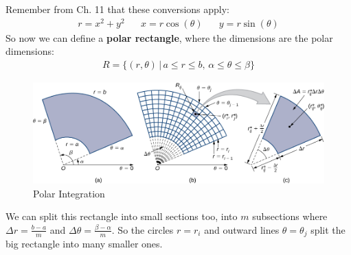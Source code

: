 \documentclass{article}
\begin{document}
Remember from Ch. 11 that these conversions apply:
\begin{gather*}
    r = x^2 + y^2 \hspace{20pt} x = r\cos(\theta) \hspace{20pt} y = r\sin(\theta)
\end{gather*}
So now we can define a \textbf{polar rectangle}, where the dimensions are the polar dimensions:
\begin{gather*}
    R =\{(r,\theta)\,|\, a \leqslant r \leqslant b,\, \alpha \leqslant \theta \leqslant \beta\}
\end{gather*}
\begin{figure}[H]
\begin{center}
\includegraphics[scale=0.5]{PolarRect.png}
\caption{Polar Integration}
\label{polrect}
\end{center}
\end{figure}
We can split this rectangle into small sections too, into $m$ subsections where $\Delta r = \frac{b-a}{m}$ and $\Delta \theta = \frac{\beta - \alpha}{m}$. So the circles $r = r_i$ and outward lines $\theta = \theta_j$ split the big rectangle into many smaller ones.
\end{document}
